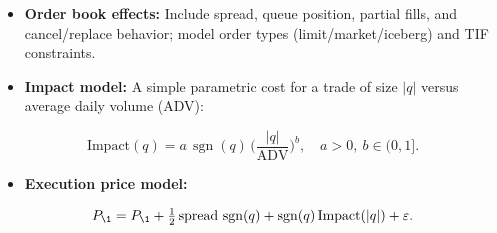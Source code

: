 \documentclass[11pt]{article}
\begin{document}
\begin{itemize}
\item   \textbf{Order book effects:} Include spread, queue position, partial fills, and cancel/replace behavior; model order types (limit/market/iceberg) and TIF constraints.
\item   \textbf{Impact model:} A simple parametric cost for a trade of size $|q|$ versus average daily volume (ADV):

\end{itemize}
\begin{equation}
\text{Impact}(q) = a\,\operatorname{sgn}(q)\,\Big(\frac{|q|}{\mathrm{ADV}}\Big)^b,\quad a>0,\ b\in(0,1].
\end{equation}

\begin{itemize}
\item   \textbf{Execution price model:}

\end{itemize}
\begin{equation}
P_{\text{\1}} = P_{\text{\1}} + \tfrac{1}{2}\,\text{spread}\,\operatorname{sgn}(q) + \operatorname{sgn}(q)\,\text{Impact}(|q|) + \varepsilon.
\end{equation}
\end{document}
